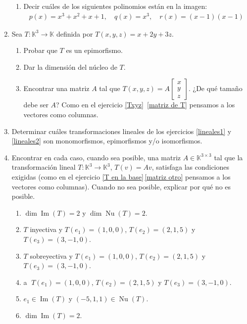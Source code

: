 \begin{enumerate}[topsep=6pt, itemsep=.4cm]
\begin{enumerate}
        \item Decir cuáles de los siguientes polinomios están en la imagen:
            \begin{align*}
                p(x)=x^3+x^2+x+1,\quad q(x)=x^3, \quad r(x)=(x-1)(x-1) 
            \end{align*}
    \end{enumerate}



\item\label{funcional ej}  Sea $T:\mathbb{K}^3\longrightarrow\mathbb{K}$ definida por $T(x,y,z)=x+2y+3z$.
\begin{enumerate}
    \item Probar que $T$ es un epimorfismo.
    \item Dar la dimensión del núcleo de $T$.
    \item Encontrar una matriz $A$ tal que
        $T(x,y,z)=A\begin{bmatrix}
        x\\y\\z \end{bmatrix}$. ¿De qué tamaño debe ser $A$? Como en el ejercicio \ref{Txyz}\, \ref{matriz de T} pensamos a los vectores como columnas. 
\end{enumerate}


\item Determinar cuáles transformaciones lineales de los ejercicios  \ref{lineales1} y \ref{lineales2} son monomorfismos, epimorfismos y/o isomorfismos.



\item\label{usar-1} Encontrar en cada caso, cuando sea posible, una matriz $A\in\mathbb{K}^{3\times 3}$ tal que la transformación lineal $T:\mathbb{K}^3\longrightarrow\mathbb{K}^3$, $T(v)=Av$, satisfaga las condiciones exigidas (como en el ejercicio  \ref{T en la base}\,\ref{matriz otro} pensamos a los vectores como columnas). Cuando no sea posible, explicar por qué no es posible.
\begin{enumerate}[ topsep=5pt,itemsep=5pt]
    \item $\operatorname{dim} \operatorname{Im}(T)=2$ y $\operatorname{dim}\operatorname{Nu}(T)=2$.
    \item $T$ inyectiva y $T(e_1)=(1,0,0)$, $T(e_2)=(2,1,5)$ y $T(e_3)=(3,-1,0)$.
    \item $T$ sobreyectiva y $T(e_1)=(1,0,0)$, $T(e_2)=(2,1,5)$ y $T(e_3)=(3,-1,0)$.
    
    \item\label{usar Txyz} \textcircled{a} $T(e_1)=(1,0,0)$, $T(e_2)=(2,1,5)$ y $T(e_3)=(3,-1,0)$.
    
    \item $e_1\in\operatorname{Im}(T)$ y $(-5,1,1)\in\operatorname{Nu}(T)$.
    
    \item $\operatorname{dim} \operatorname{Im}(T)=2$.
\end{enumerate}
    


\end{enumerate}


